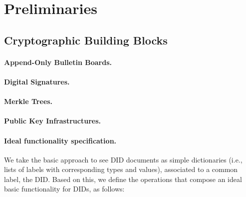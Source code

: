 \section{Preliminaries}
\label{sec:preliminaries}

\subsection{Cryptographic Building Blocks}
\label{ssec:bbs}


\paragraph{Append-Only Bulletin Boards.} %

\paragraph{Digital Signatures.} %

\paragraph{Merkle Trees.}

\paragraph{Public Key Infrastructures.} %

\paragraph{Ideal functionality specification.} %

\iffalse
We take the basic approach to see DID documents as simple dictionaries
(i.e., lists of labels with corresponding types and values), associated to a
common label, the DID. Based on this, we define the operations that compose an
ideal basic functionality for DIDs, as follows:

